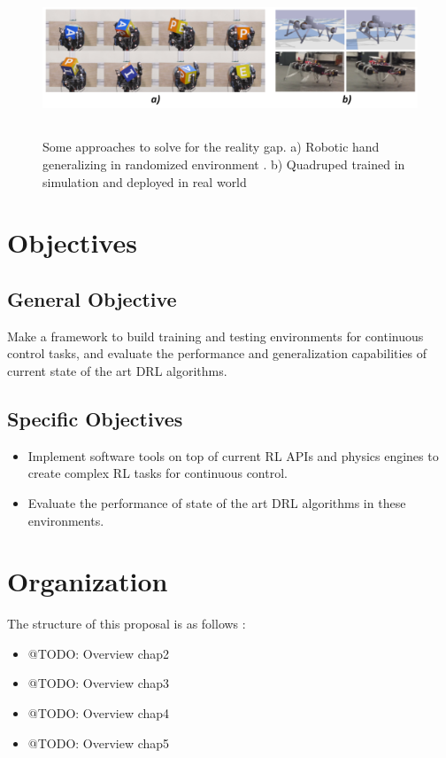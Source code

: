 \begin{figure}[!ht]
	\centering
	\includegraphics[width=6.0in,height=1.8in]{./chapters/imgs/img_reality_gap_approaches.png}
	\caption[Reality gap approaches]{Some approaches to solve for the reality gap. 
		a) Robotic hand generalizing in randomized environment \citep{dexterity-openai}.
		b) Quadruped trained in simulation and deployed in real world \citep{simtoreal-quadruped} }
	\label{fig:reality-gap-approaches}
\end{figure}

\section{Objectives}
\label{sec:objectives}

\subsection*{General Objective}
Make a framework to build training and testing environments for continuous control tasks, and 
evaluate the performance and generalization capabilities of current state of the art DRL algorithms.

\subsection*{Specific Objectives}
\begin{itemize}
 \item Implement software tools on top of current RL APIs and physics engines 
       to create complex RL tasks for continuous control.
 \item Evaluate the performance of state of the art DRL algorithms in these environments.
\end{itemize}

\section{Organization}
\label{sec:organization}

The structure of this proposal is as follows :

\begin{itemize}
	\item @TODO: Overview chap2
	\item @TODO: Overview chap3
	\item @TODO: Overview chap4
	\item @TODO: Overview chap5
\end{itemize}